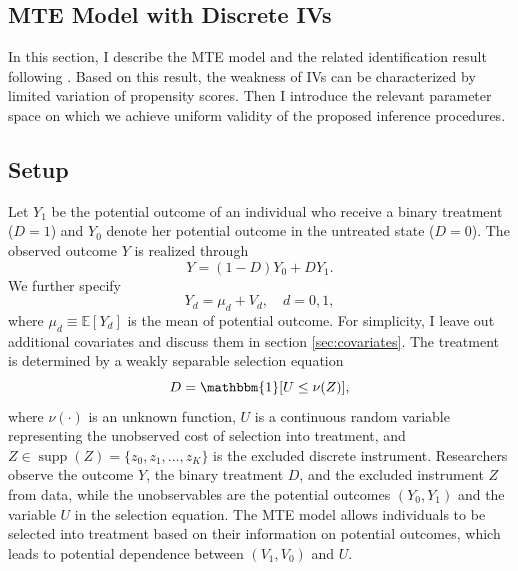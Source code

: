 \documentclass[11pt]{article}
\theoremstyle{definition}
\DeclareMathOperator*{\supp}{supp}
\newcommand{\Exp}{\ensuremath{\mathbb{E}}} %
\newcommand{\0}{\ensuremath{\mathbf{0}}}
\newcommand{\indicator}{\ensuremath{\mathbbm{1}}}
\begin{document}
\begin{bibunit}
%

\clearpage 

%
\section{MTE Model with Discrete IVs}
\label{sec:model}
In this section, I describe the MTE model and the related identification result following \cite{brinch/mogstad/wiswall:2017}. Based on this result, the weakness of IVs can be characterized by limited variation of propensity scores. Then I introduce the relevant parameter space on which we achieve uniform validity of the proposed inference procedures.

%
\subsection{Setup}
Let $Y_1$ be the potential outcome of an individual who receive a binary treatment ($D = 1$) and $Y_0$ denote her potential outcome in the untreated state ($D = 0$). The observed outcome $Y$ is realized through
\begin{equation}
\label{eq:outcome}
    Y = (1-D)Y_0 + DY_1.  
\end{equation}
We further specify
\[
    Y_d = \mu_d + V_d, \quad d = 0,1,
\]
where $\mu_d \equiv \Exp[Y_d]$ is the mean of potential outcome. For simplicity, I leave out additional covariates and discuss them in section \ref{sec:covariates}. The treatment is determined by a weakly separable selection equation
\begin{equation}
\label{eq:selection}
    D = \indicator[U \leq \nu(Z)],
\end{equation}
where $\nu(\cdot)$ is an unknown function, $U$ is a continuous random variable representing the unobserved cost of selection into treatment, and $Z \in \supp(Z) = \{z_0, z_1, \ldots, z_K\}$ is the excluded discrete instrument. Researchers observe the outcome $Y$, the binary treatment $D$, and the excluded instrument $Z$ from data, while the unobservables are the potential outcomes $(Y_0, Y_1)$ and the variable $U$ in the selection equation. The MTE model allows individuals to be selected into treatment based on their information on potential outcomes, which leads to potential dependence between $(V_1, V_0)$ and $U$. 


\end{bibunit}
\end{document}

